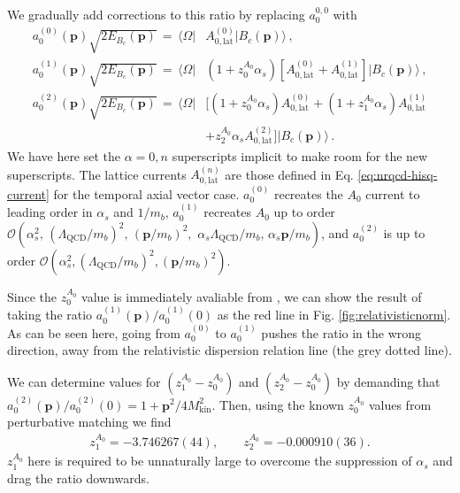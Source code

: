 We gradually add corrections to this ratio by replacing $a_0^{0,0}$ with
\begin{align}
  \nonumber
  \label{eq:a_0corrections}
  a_0^{(0)}({\textbf{p}}) \sqrt{2E_{B_c}({\textbf{p}})} \,=\, \langle \Omega |& A_{0,\text{lat}}^{(0)} | B_c  ({\textbf{p}}) \rangle\,, \\
  \nonumber
  a_0^{(1)}({\textbf{p}}) \sqrt{2E_{B_c}({\textbf{p}})} \,=\, \langle \Omega |& (1+z^{A_0}_0 \alpha_s ) \left[A_{0,\text{lat}}^{(0)} +  A_{0,\text{lat}}^{(1)} \right] | B_c({\textbf{p}}) \rangle\,, \\
  \nonumber
  a_0^{(2)}({\textbf{p}}) \sqrt{2E_{B_c}({\textbf{p}})} \,=\, \langle \Omega |& \big[ (1+z^{A_0}_0 \alpha_s ) A_{0,\text{lat}}^{(0)} + (1 + z^{A_0}_1\alpha_s) A_{0,\text{lat}}^{(1)} \\ &+ z^{A_0}_2\alpha_s A_{0,\text{lat}}^{(2)}  \big] | B_c({\textbf{p}})\rangle\,.
\end{align}
We have here set the $\alpha=0,n$ superscripts implicit to make room for the new superscripts. The lattice currents $A_{0,\text{lat}}^{(n)}$ are those defined in Eq. \eqref{eq:nrqcd-hisq-current} for the temporal axial vector case. $a_0^{(0)}$ recreates the $A_0$ current to leading order in $\alpha_s$ and $1/m_b$, $a_0^{(1)}$ recreates $A_0$ up to order $\mathcal{O}(\alpha_s^2, \,(\Lambda_{\text{QCD}}/m_b)^2,\, ({\textbf{p}}/m_b)^2,\,\,\alpha_s \Lambda_{\text{QCD}} / m_b,\, \alpha_s {\textbf{p}}/m_b )$, and $a_0^{(2)}$ is up to order $\mathcal{O}( \alpha_s^2, (\Lambda_{\text{QCD}}/m_b)^2, ({\textbf{p}}/m_b)^2 )$.

Since the $z_0^{A_0}$ value is immediately avaliable from \cite{Monahan:2012dq}, we can show the result of taking the ratio $a_0^{(1)}({\textbf{p}})/a_0^{(1)}(0)$ as the red line in Fig. \ref{fig:relativisticnorm}. As can be seen here, going from $a_0^(0)$ to $a_0^{(1)}$ pushes the ratio in the wrong direction, away from the relativistic dispersion relation line (the grey dotted line).

  We can determine values for $\left(z_1^{A_0}-z_0^{A_0}\right)$ and $\left(z_2^{A_0}-z_0^{A_0}\right)$ by demanding that $a^{(2)}_0({\textbf{p}})/a^{(2)}_0(0) = 1 + {\textbf{p}}^2/4M_{\text{kin}}^2$. Then, using the known $z_0^{A_0}$ values from perturbative matching we find
  \begin{align}
    z_1^{A_0} = -3.746267(44),\quad\quad z_2^{A_0} = -0.000910(36).
  \end{align}
  $z_1^{A_0}$ here is required to be unnaturally large to overcome the suppression of $\alpha_s$ and drag the ratio downwards. 

